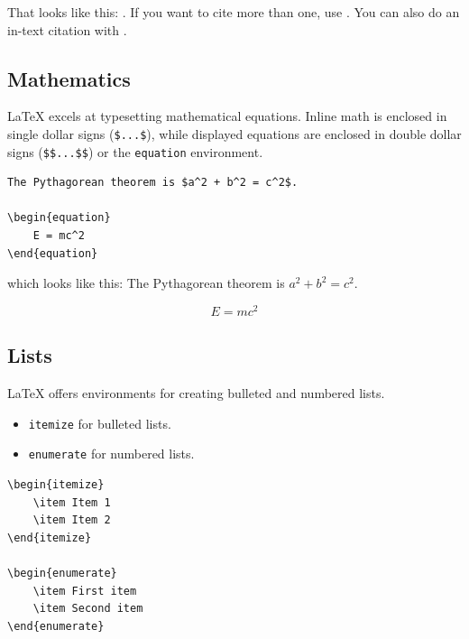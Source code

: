 That looks like this: 
\citep{louis2018testing}. If you want to cite more than one, use \citep{louis2018testing, mcnoleg1996integration}. You can also do an in-text citation with \citet{louis2018testing}. 

\subsection{Mathematics}

LaTeX excels at typesetting mathematical equations. Inline math is enclosed in single dollar signs (\texttt{\$...\$}), while displayed equations are enclosed in double dollar signs (\texttt{\$\$...\$\$}) or the \texttt{equation} environment.

\begin{verbatim}
The Pythagorean theorem is $a^2 + b^2 = c^2$.

\begin{equation}
    E = mc^2
\end{equation}
\end{verbatim}

which looks like this:
The Pythagorean theorem is $a^2 + b^2 = c^2$.

\begin{equation}
    E = mc^2
\end{equation}

\subsection{Lists}

LaTeX offers environments for creating bulleted and numbered lists.

\begin{itemize}
    \item \texttt{itemize} for bulleted lists.
    \item \texttt{enumerate} for numbered lists.
\end{itemize}

\begin{verbatim}
\begin{itemize}
    \item Item 1
    \item Item 2
\end{itemize}

\begin{enumerate}
    \item First item
    \item Second item
\end{enumerate}
\end{verbatim}

